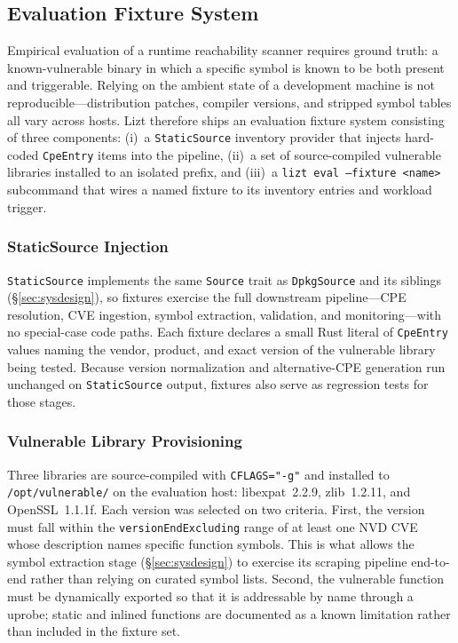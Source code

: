 \documentclass[conference]{IEEEtran}
\begin{document}
\subsection{Evaluation Fixture System}
\label{sec:fixtures}

Empirical evaluation of a runtime reachability scanner requires ground truth: a known-vulnerable binary in which a specific symbol is known to be both present and triggerable.
Relying on the ambient state of a development machine is not reproducible---distribution patches, compiler versions, and stripped symbol tables all vary across hosts.
Lizt therefore ships an evaluation fixture system consisting of three components: (i)~a \texttt{StaticSource} inventory provider that injects hard-coded \texttt{CpeEntry} items into the pipeline, (ii)~a set of source-compiled vulnerable libraries installed to an isolated prefix, and (iii)~a \texttt{lizt eval --fixture <name>} subcommand that wires a named fixture to its inventory entries and workload trigger.

\subsubsection{StaticSource Injection}

\texttt{StaticSource} implements the same \texttt{Source} trait as \texttt{DpkgSource} and its siblings (\S\ref{sec:sysdesign}), so fixtures exercise the full downstream pipeline---CPE resolution, CVE ingestion, symbol extraction, validation, and monitoring---with no special-case code paths.
Each fixture declares a small Rust literal of \texttt{CpeEntry} values naming the vendor, product, and exact version of the vulnerable library being tested.
Because version normalization and alternative-CPE generation run unchanged on \texttt{StaticSource} output, fixtures also serve as regression tests for those stages.

\subsubsection{Vulnerable Library Provisioning}

Three libraries are source-compiled with \texttt{CFLAGS="-g"} and installed to \texttt{/opt/vulnerable/} on the evaluation host: libexpat~2.2.9, zlib~1.2.11, and OpenSSL~1.1.1f.
Each version was selected on two criteria.
First, the version must fall within the \texttt{versionEndExcluding} range of at least one NVD CVE whose description names specific function symbols.
This is what allows the symbol extraction stage (\S\ref{sec:sysdesign}) to exercise its scraping pipeline end-to-end rather than relying on curated symbol lists.
Second, the vulnerable function must be dynamically exported so that it is addressable by name through a uprobe; static and inlined functions are documented as a known limitation rather than included in the fixture set.
\end{document}
